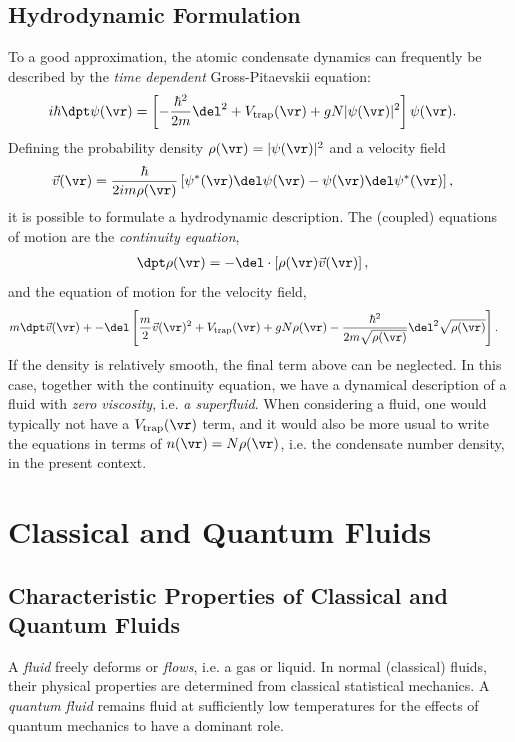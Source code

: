 \documentclass[a4paper, 11pt, normalem]{report}
\begin{document}
\section{Hydrodynamic Formulation}
To a good approximation, the atomic condensate dynamics can frequently be described by the \emph{time dependent} Gross-Pitaevskii equation:
\begin{align}
    i\hbar\dpt\psi(\vr) &= \left[-\frac{\hbar^2}{2m}\del^2 + V_{\text{trap}}(\vr) + gN|\psi(\vr)|^2\right]\psi(\vr).
\end{align}
Defining the probability density $\rho(\vr)=|\psi(\vr)|^2$ and a velocity field
\begin{align}
    \vec{v}(\vr) &= \frac{\hbar}{2im\rho(\vr)}\left[\psi^*(\vr)\del\psi(\vr) - \psi(\vr)\del\psi^*(\vr)\right],
\end{align}
it is possible to formulate a hydrodynamic description.
The (coupled) equations of motion are the \emph{continuity equation},
\begin{align}
    \dpt\rho(\vr) &= -\del\cdot\left[\rho(\vr)\vec{v}(\vr)\right],
\end{align}
and the equation of motion for the velocity field,
\begin{align}
    m\dpt\vec{v}(\vr) &+ -\del\left[\frac{m}{2}\vec{v}(\vr)^2 + V_{\text{trap}}(\vr) + gN\rho(\vr) - \frac{\hbar^2}{2m\sqrt{\rho(\vr)}}\del^2\sqrt{\rho(\vr)}\right].
\end{align}
If the density is relatively smooth, the final term above can be neglected.
In this case, together with the continuity equation, we have a dynamical description of a fluid with \emph{zero viscosity}, i.e. \emph{a superfluid}.
When considering a fluid, one would typically not have a $V_{\text{trap}}(\vr)$ term, and it would also be more usual to write the equations in terms of $n(\vr)=N\rho(\vr)$, i.e. the condensate number density, in the present context.

\chapter{Classical and Quantum Fluids}
\section{Characteristic Properties of Classical and Quantum Fluids}
A \emph{fluid} freely deforms or \emph{flows}, i.e. a gas or liquid.
In normal (classical) fluids, their physical properties are determined from classical statistical mechanics.
A \emph{quantum fluid} remains fluid at sufficiently low temperatures for the effects of quantum mechanics to have a dominant role.
\end{document}

